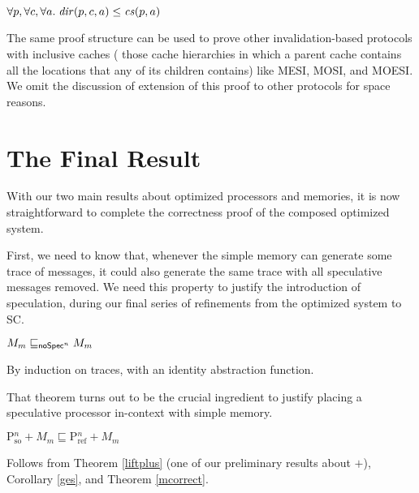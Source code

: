 \begin{lemma}%
$\forall p, \forall c, \forall a.\; \mathit{dir}(p,c,a) \le \mathit{cs}(p, a)$
\end{lemma}

The same proof structure can be used to prove other invalidation-based
protocols with inclusive caches (\ie{} those cache hierarchies in which a
parent cache contains all the locations that any of its children contains) like
MESI, MOSI, and MOESI. We omit the discussion of extension of this proof to
other protocols for space reasons.

\section{The Final Result}\label{sec:finalresult}

With our two main results about optimized processors and memories, it
is now straightforward to complete the correctness proof of the
composed optimized system.

First, we need to know that, whenever the simple memory can generate
some trace of messages, it could also generate the same trace with all
speculative messages removed.  We need this property to justify the
introduction of speculation, during our final series of refinements
from the optimized system to SC.

\begin{theorem}
\label{mcorrect}
$M_m \sqsubseteq_{\mathsf{noSpec}^n} M_m$
\end{theorem}
\begin{prf}
By induction on traces, with an identity abstraction function.
\end{prf}

That theorem turns out to be the crucial ingredient to justify placing
a speculative processor in-context with simple memory.

\begin{theorem}
\label{ocorrect1}
$\text{P$^n_\text{so}$} + M_m \sqsubseteq \text{P$^n_\text{ref}$} + M_m$
\end{theorem}
\begin{prf}
Follows from Theorem \ref{liftplus} (one of our preliminary results
about $+$), Corollary \ref{ges}, and Theorem \ref{mcorrect}.
\end{prf}

